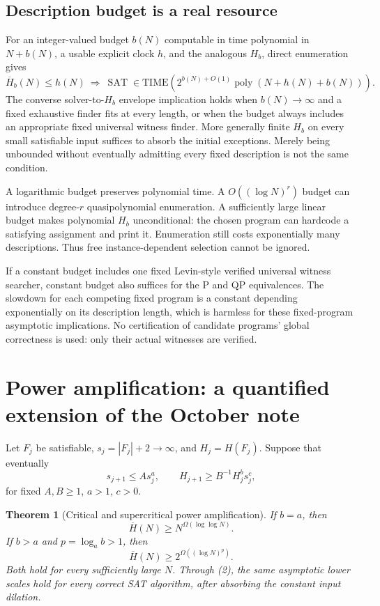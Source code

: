\documentclass[11pt]{article}
\newtheorem{theorem}{Theorem}
\newcommand{\SAT}{\operatorname{SAT}}
\newcommand{\poly}{\operatorname{poly}}
\newcommand{\Hbar}{\overline H}
\begin{document}
\subsection{Description budget is a real resource}
For an integer-valued budget $b(N)$ computable in time polynomial in
$N+b(N)$, a usable explicit clock $h$, and the analogous $H_b$, direct
enumeration gives
\[
 \Hbar_b(N)\le h(N)
 \ \Longrightarrow\
 \SAT\in\mathrm{TIME}\left(
 2^{b(N)+O(1)}\poly(N+h(N)+b(N))\right).
 \tag{5}
\]
The converse solver-to-$H_b$ envelope implication holds when
$b(N)\to\infty$ and a fixed exhaustive finder fits at every length,
or when the budget always includes an appropriate fixed universal witness
finder. More generally finite $H_b$ on every small satisfiable input
suffices to absorb the initial exceptions.
Merely being unbounded without eventually admitting every fixed
description is not the same condition.

A logarithmic budget preserves polynomial time. A
$O((\log N)^r)$ budget can introduce degree-$r$ quasipolynomial enumeration.
A sufficiently large linear budget makes polynomial $H_b$ unconditional:
the chosen program can hardcode a satisfying assignment and print it.
Enumeration still costs exponentially many descriptions. Thus free
instance-dependent selection cannot be ignored.

If a constant budget includes one fixed Levin-style verified universal
witness searcher, constant budget also suffices for the P and QP
equivalences. The slowdown for each competing fixed program is a constant
depending exponentially on its description length, which is harmless for
these fixed-program asymptotic implications. No certification of candidate
programs' global correctness is used: only their actual witnesses are
verified.

\section{Power amplification: a quantified extension of the October note}

Let $F_j$ be satisfiable, $s_j=|F_j|+2\to\infty$, and $H_j=H(F_j)$.
Suppose that eventually
\[
 s_{j+1}\le A s_j^a,\qquad
 H_{j+1}\ge B^{-1}H_j^b s_j^c,
 \tag{6}
\]
for fixed $A,B\ge1$, $a>1$, $c>0$.

\begin{theorem}[Critical and supercritical power amplification]
If $b=a$, then
\[
 \Hbar(N)\ge N^{\Omega(\log\log N)}.
 \tag{7}
\]
If $b>a$ and $p=\log_a b>1$, then
\[
 \Hbar(N)\ge 2^{\Omega((\log N)^p)}.
 \tag{8}
\]
Both hold for every sufficiently large $N$. Through (2), the same
asymptotic lower scales hold for every correct SAT algorithm, after
absorbing the constant input dilation.
\end{theorem}
\end{document}
